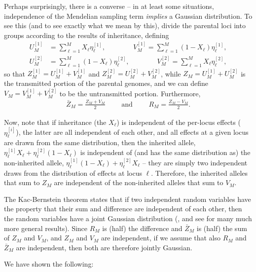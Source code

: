 \documentclass{article}
\newcommand{\1}{\mathbbm{1}}
\theoremstyle{remark}
\theoremstyle{definition}
\begin{document}
Perhaps surprisingly, there is a converse --
in at least some situations,
independence of the Mendelian sampling term \emph{implies} a Gaussian distribution.
To see this (and to see exactly what we mean by this),
divide the parental loci into groups according to the results of inheritance,
defining
\begin{align*}
    U_M^{[1]} &= \sum_{\ell=1}^M X_\ell \eta_\ell^{[1]}  ,
    \qquad \qquad
    V_M^{[1]} = \sum_{\ell=1}^M (1-X_\ell) \eta_\ell^{[1]} ,  \\
    U_M^{[2]} &= \sum_{\ell=1}^M (1-X_\ell) \eta_\ell^{[2]} ,
    \qquad \qquad
    V_M^{[2]} = \sum_{\ell=1}^M X_\ell \eta_\ell^{[2]}  ,
\end{align*}
so that 
$Z_M^{[1]} = U_M^{[1]} + V_M^{[1]}$ and
$Z_M^{[2]} = U_M^{[2]} + V_M^{[2]}$, while
$Z_M = U_M^{[1]} + U_M^{[2]}$ is the transmitted portion of the parental genomes,
and we can define $V_M = V_M^{[1]} + V_M^{[2]}$ to be the untransmitted portion.
Furthermore,
\begin{align*}
    \bar Z_M = \frac{Z_M + V_M}{2}
    \qquad \text{ and } \qquad
    R_M = \frac{Z_M - V_M}{ 2 } .
\end{align*}

Now, note that if inheritance (the $X_\ell$) is independent of the per-locus effects ($\eta_\ell^{[i]}$),
the latter are all independent of each other,
and all effects at a given locus are drawn from the same distribution,
then the inherited allele, 
$\eta_\ell^{[1]} X_\ell + \eta_\ell^{[2]} (1-X_\ell)$
is independent of (and has the same distribution as)
the non-inherited allele,
$\eta_\ell^{[1]} (1-X_\ell) + \eta_\ell^{[2]} X_\ell$
-- they are simply two independent draws from the distribution of effects at locus $\ell$.
Therefore, the inherited alleles that sum to $Z_M$
are independent of the non-inherited alleles that sum to $V_M$.

The Kac-Bernstein theorem states that if two independent random variables
have the property that their sum and difference are independent of each other,
then the random variables have a joint Gaussian distribution
(\citet{kac1939characterization,bernstein1941property},
and see \citet{kagan1973characterization} for many much more general results).
Since $R_M$ is (half) the difference and $\bar Z_M$ is (half) the sum
of $Z_M$ and $V_M$, and $Z_M$ and $V_M$ are independent,
if we assume that also $R_M$ and $\bar Z_M$ are independent,
then both are therefore jointly Gaussian.

We have shown the following:
\end{document}
